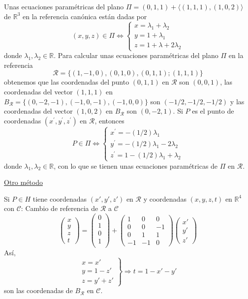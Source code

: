 \documentclass[12pt, a4paper, ones, notitlepage, openany,titlepage]{article}
\begin{document}
Unas ecuaciones paramétricas del plano $\Pi=(0,1,1)+\langle(1,1,1),(1,0,2)\rangle$ de $\mathbb{R}^{3}$ en la referencia canónica están dadas por
$$
(x, y, z) \in \Pi \Longleftrightarrow\left\{\begin{array}{l}
x=\lambda_{1}+\lambda_{2} \\
y=1+\lambda_{1} \\
z=1+\lambda+2 \lambda_{2}
\end{array}\right.
$$
donde $\lambda_{1}, \lambda_{2} \in \mathbb{R}$. Para calcular unas ecuaciones paramétricas del plano $\Pi$ en la referencia
$$
\mathcal{R}=\{(1,-1,0),(0,1,0),(0,1,1) ;(1,1,1)\}
$$
obtenemos que las coordenadas del punto $(0,1,1)$ en $\mathcal{R}$ son $(0,0,1)$, las coordenadas del vector $(1,1,1)$ en $B_{\mathcal{R}}=\{(0,-2,-1),(-1,0,-1),(-1,0,0)\}$ son $(-1 / 2,-1 / 2,-1 / 2)$ y las coordenadas del vector $(1,0,2)$ en $B_{\mathcal{R}}$ son $(0,-2,1)$. Si $P$ es el punto de coordenadas $\left(x^{\prime}, y^{\prime}, z^{\prime}\right)$ en $\mathcal{R}$, entonces
$$
P \in \Pi \Longleftrightarrow\left\{\begin{array}{l}
x^{\prime}=-(1 / 2) \lambda_{1} \\
y^{\prime}=-(1 / 2) \lambda_{1}-2 \lambda_{2} \\
z^{\prime}=1-(1 / 2) \lambda_{1}+\lambda_{2}
\end{array}\right.
$$
donde $\lambda_{1}, \lambda_{2} \in \mathbb{R}$, con lo que se tienen unas ecuaciones paramétricas de $\Pi$ en $\mathcal{R}$.

\noindent\underline{Otro método}

Si $P \in H$ tiene coordenadas $(x',y',z')$ en $\mathcal{R}$ y coordenadas $(x,y,z,t)$ en $\mathbb{R}^4$ con $\mathcal{C}$: Cambio de referencia de $\mathcal{R}$ a $\mathcal{C}$
$$
\begin{pmatrix}
	x \\
	y \\
	z \\
	t
\end{pmatrix} = \begin{pmatrix}
	0 \\
	1 \\
	0 \\
	1 \\ 
\end{pmatrix} + \begin{pmatrix}
	1 & 0 & 0 \\
	0 & 0 & -1 \\
	0 & 1 & 1 \\
	-1 & -1 & 0
\end{pmatrix} \begin{pmatrix}
	x' \\
	y' \\
	z'
\end{pmatrix}
$$
Así,
$$
\left. \begin{array}{r}
	x = x' \\
	y = 1 - z' \\
	z = y' + z'
\end{array} \right\} \Longrightarrow t = 1 - x' - y'
$$
son las coordenadas de $B_\mathcal{R}$ en $\mathcal{C}$.
\end{document}

